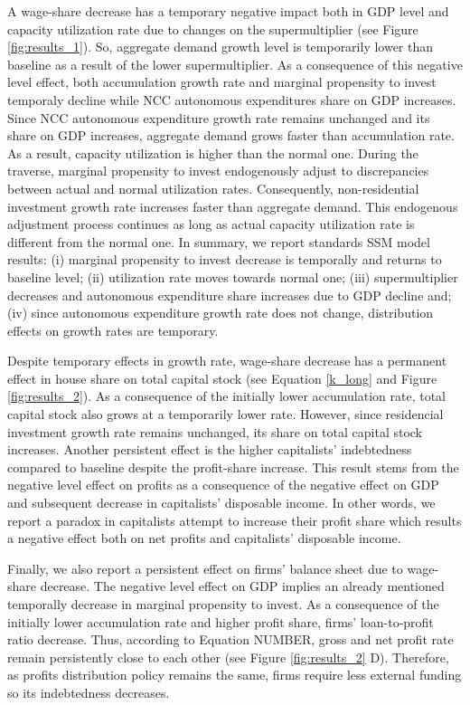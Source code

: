\documentclass[11pt]{article}
\begin{document}
A wage-share decrease has a temporary negative impact both in GDP level and capacity utilization rate due to changes on the supermultiplier (see Figure \ref{fig:results_1}).
So, aggregate demand growth level is temporarily lower than baseline as a result of the lower supermultiplier.
As a consequence of this negative level effect, both accumulation growth rate and marginal propensity to invest temporaly decline while NCC autonomous expenditures share on GDP increases.
Since NCC autonomous expenditure growth rate remains unchanged and its share on GDP increases, aggregate demand grows faster than accumulation rate.
As a result, capacity utilization is higher than the normal one.
During the traverse, marginal propensity to invest endogenously adjust to discrepancies between actual and normal utilization rates.
Consequently, non-residential investment growth rate increases faster than aggregate demand.
This endogenous adjustment process continues as long as actual capacity utilization rate is different from the normal one.
In summary, we report standards SSM model results:
    (i) marginal propensity to invest decrease is temporally and returns to baseline level;
    (ii) utilization rate moves towards normal one;
    (iii) supermultiplier decreases and autonomous expenditure share increases due to GDP decline and; 
    (iv) since autonomous expenditure growth rate does not change, distribution effects on growth rates are temporary. 


Despite temporary effects in growth rate, wage-share decrease has a permanent effect in house share on total capital stock (see Equation \ref{k_long} and Figure \ref{fig:results_2}).
As a consequence of the initially lower accumulation rate, total capital stock also grows at a temporarily lower rate.
However, since residencial investment growth rate remains unchanged, its share on total capital stock increases.
Another persistent effect is the higher capitalists' indebtedness compared to baseline despite the profit-share increase.
This result stems from the negative level effect on profits as a consequence of the negative effect on GDP and subsequent decrease in capitalists' disposable income.
In other words, we report a paradox in capitalists attempt to increase their profit share which results a negative effect both on net profits and capitalists' disposable income.

Finally, we also report a persistent effect on firms' balance sheet due to wage-share decrease.
The negative level effect on GDP implies an already mentioned temporally decrease in marginal propensity to invest.
As a consequence of the initially lower accumulation rate and higher profit share, firms' loan-to-profit ratio decrease.
Thus, according to Equation NUMBER, gross and net profit rate remain persistently close to each other (see Figure \ref{fig:results_2} D).
Therefore, as profits distribution policy remains the same, firms require less external funding so its indebtedness decreases.
\end{document}
